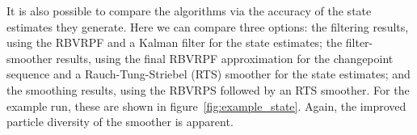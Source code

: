 \documentclass[journal]{IEEEtran}
\begin{document}
It is also possible to compare the algorithms via the accuracy of the state estimates they generate. Here we can compare three options: the filtering results, using the RBVRPF and a Kalman filter for the state estimates; the filter-smoother results, using the final RBVRPF approximation for the changepoint sequence and a Rauch-Tung-Striebel (RTS) smoother for the state estimates; and the smoothing results, using the RBVRPS followed by an RTS smoother. For the example run, these are shown in figure~\ref{fig:example_state}. Again, the improved particle diversity of the smoother is apparent.

\begin{figure}[!t]
\centering
{} \\
 \\

\end{figure}
\end{document}
